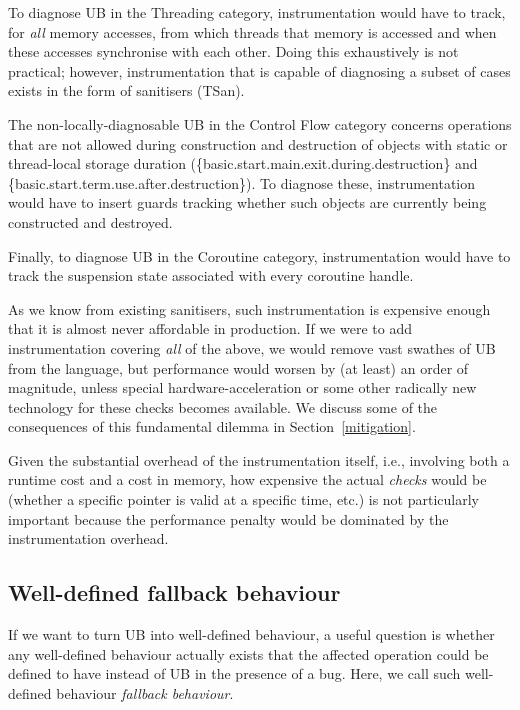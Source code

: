 To diagnose UB in the Threading category, instrumentation would have to track, for \emph{all} memory accesses, from which threads that memory is accessed and when these accesses synchronise with each other. Doing this exhaustively is not practical; however, instrumentation that is capable of diagnosing a subset of cases exists in the form of sanitisers (TSan).

The non-locally-diagnosable UB in the Control Flow category concerns operations that are not allowed during construction and destruction of objects with static or thread-local storage duration (\{basic.start.main.exit.during.destruction\} and \{basic.start.term.use.after.destruction\}). To diagnose these, instrumentation would have to insert guards tracking whether such objects are currently being constructed and destroyed.  

Finally, to diagnose UB in the Coroutine category, instrumentation would have to track the suspension state associated with every coroutine handle.

As we know from existing sanitisers, such instrumentation is expensive enough that it is almost never affordable in production. If we were to add instrumentation covering \emph{all} of the above, we would remove vast swathes of UB from the language, but performance would worsen by (at least) an order of magnitude, unless special hardware-acceleration or some other radically new technology for these checks becomes available. We discuss some of the consequences of this fundamental dilemma in Section~\ref{mitigation}.

Given the substantial overhead of the instrumentation itself, i.e., involving both a runtime cost and a cost in memory, how expensive the actual \emph{checks} would be (whether a specific pointer is valid at a specific time, etc.) is not particularly important because the performance penalty would be dominated by the instrumentation overhead.

\subsection{Well-defined fallback behaviour}
\label{fallback}

If we want to turn UB into well-defined behaviour, a useful question is whether any well-defined behaviour actually exists that the affected operation could be defined to have instead of UB in the presence of a bug. Here, we call such well-defined behaviour \emph{fallback behaviour}. 

